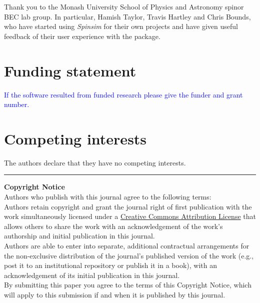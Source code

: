 \documentclass{jors}
\begin{document}
Thank you to the Monash University School of Physics and Astronomy spinor BEC lab group. In particular, Hamish Taylor, Travis Hartley and Chris Bounds, who have started using \emph{Spinsim} for their own projects and have given useful feedback of their user experience with the package.

\section{Funding statement}

\textcolor{blue}{If the software resulted from funded research please give the funder and grant number.}

\section{Competing interests}

The authors declare that they have no competing interests.

{}


\vspace{2cm}

\rule{\textwidth}{1pt}

{ \bf Copyright Notice} \\
Authors who publish with this journal agree to the following terms: \\

Authors retain copyright and grant the journal right of first publication with the work simultaneously licensed under a  \href{http://creativecommons.org/licenses/by/3.0/}{Creative Commons Attribution License} that allows others to share the work with an acknowledgement of the work's authorship and initial publication in this journal. \\

Authors are able to enter into separate, additional contractual arrangements for the non-exclusive distribution of the journal's published version of the work (e.g., post it to an institutional repository or publish it in a book), with an acknowledgement of its initial publication in this journal. \\

By submitting this paper you agree to the terms of this Copyright Notice, which will apply to this submission if and when it is published by this journal.
\end{document}
